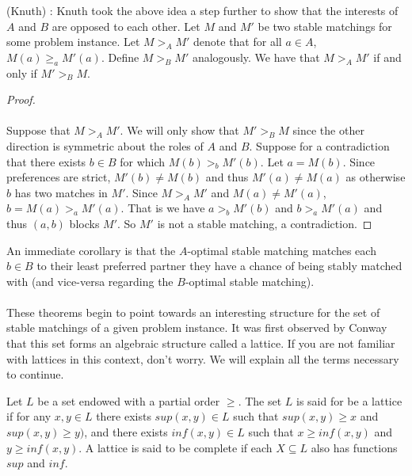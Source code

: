 \begin{theorem} (Knuth) \cite{knuthmariages}: Knuth took the above idea a step further to show that the interests of $A$ and $B$ are opposed to each other. Let $M$ and $M'$ be two stable matchings for some problem instance. Let $M >_A M'$ denote that for all $a \in A$, $M(a) \geq_a M'(a)$. Define $M >_B M'$ analogously. We have that $M >_A M'$ if and only if $M' >_B M$.
\end{theorem}
\begin{proof}
\paragraph{}
Suppose that $M >_A M'$. We will only show that $M' >_B M$ since the other direction is symmetric about the roles of $A$ and $B$. Suppose for a contradiction that there exists $b \in B$ for which $M(b) >_b M'(b)$. Let $a = M(b)$. Since preferences are strict, $M'(b) \neq M(b)$ and thus $M'(a) \neq M(a)$ as otherwise $b$ has two matches in $M'$. Since $M >_A M'$ and $M(a) \neq M'(a)$, $b=M(a) >_a M'(a)$. That is we have $a >_b M'(b)$ and $b >_a M'(a)$ and thus $(a,b)$ blocks $M'$. So $M'$ is not a stable matching, a contradiction. \end{proof}
\begin{corollary}An immediate corollary is that the $A$-optimal stable matching matches each $b \in B$ to their least preferred partner they have a chance of being stably matched with (and vice-versa regarding the $B$-optimal stable matching). 
\end{corollary}
\paragraph{}
These theorems begin to point towards an interesting structure for the set of stable matchings of a given problem instance. It was first observed by Conway \cite{knuthmariages} that this set forms an algebraic structure called a lattice. If you are not familiar with lattices in this context, don't worry. We will explain all the terms necessary to continue.
\begin{definition}
Let $L$ be a set endowed with a partial order $\geq$. The set $L$ is said for be a lattice if for any $x, y \in L$ there exists $sup(x,y) \in L$ such that $sup(x,y) \geq x$ and $sup(x,y) \geq y)$, and there exists $inf(x,y) \in L$ such that $x \geq inf(x,y)$ and $y \geq inf(x,y)$. A lattice is said to be complete if each $X \subseteq L$ also has functions $sup$ and $inf$. 
\end{definition}
